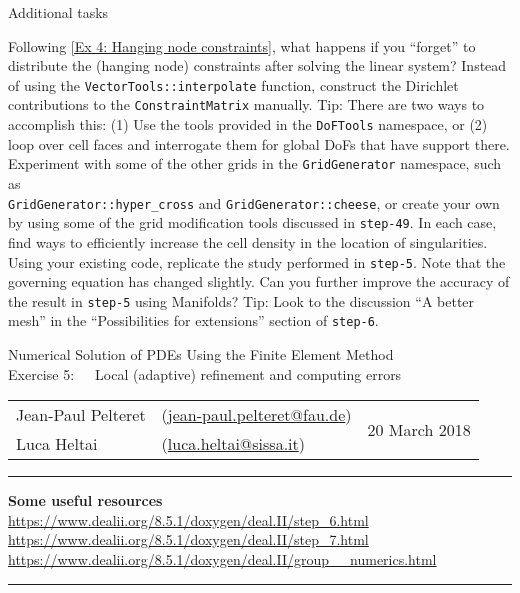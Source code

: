 \documentclass[11pt,answers]{exam}
\makeatletter
\newcommand{\makeheader}[3]{%
\setcounter{question}{0}
\begin{center}
{\sc Numerical Solution of PDEs Using the Finite Element Method}\vspace{2ex}\\
{\sc Exercise #1:\ \ \ #2}\vspace{2ex}\\
\begin{tabular*}{\textwidth}{ll @{\extracolsep{\fill}}r}
Jean-Paul Pelteret & (\url{jean-paul.pelteret@fau.de}) & \multirow{2}{*}{#3} \\
Luca Heltai & (\url{luca.heltai@sissa.it}) & \\
\end{tabular*}
\end{center}
}
\newcommand{\makeresources}[1]{%
\rule{\textwidth}{0.6mm}
\textbf{Some useful resources}\\[1.5ex]
#1 \par
\rule{\textwidth}{0.6mm}
}
\makeatother
\begin{document}
\begin{questions}
\question Additional tasks
\begin{parts}
\bonuspart Following \ref{Ex 4: Hanging node constraints}, what happens if you ``forget'' to distribute the (hanging node) constraints after solving the linear system?
\bonuspart Instead of using the \verb|VectorTools::interpolate| function, construct the Dirichlet contributions to the \verb|ConstraintMatrix| manually.
Tip: There are two ways to accomplish this: (1) Use the tools provided in the \verb|DoFTools| namespace, or (2) loop over cell faces and interrogate them for global DoFs that have support there.
\bonuspart Experiment with some of the other grids in the \verb|GridGenerator| namespace, such as \\\verb|GridGenerator::hyper_cross| and \verb|GridGenerator::cheese|, or create your own by using some of the grid modification tools discussed in \verb|step-49|.
In each case, find ways to efficiently increase the cell density in the location of singularities.
\bonuspart Using your existing code, replicate the study performed in \verb|step-5|. 
Note that the governing equation has changed slightly. 
Can you further improve the accuracy of the result in \verb|step-5| using Manifolds?
Tip: Look to the discussion ``A better mesh'' in the ``Possibilities for extensions'' section of \verb|step-6|.
\end{parts}

\end{questions}




\clearpage
\makeheader{5}{Local (adaptive) refinement and computing errors}{20 March 2018}
\makeresources{%
\url{https://www.dealii.org/8.5.1/doxygen/deal.II/step_6.html} \\
\url{https://www.dealii.org/8.5.1/doxygen/deal.II/step_7.html} \\
\url{https://www.dealii.org/8.5.1/doxygen/deal.II/group__numerics.html}
}
\end{document}
